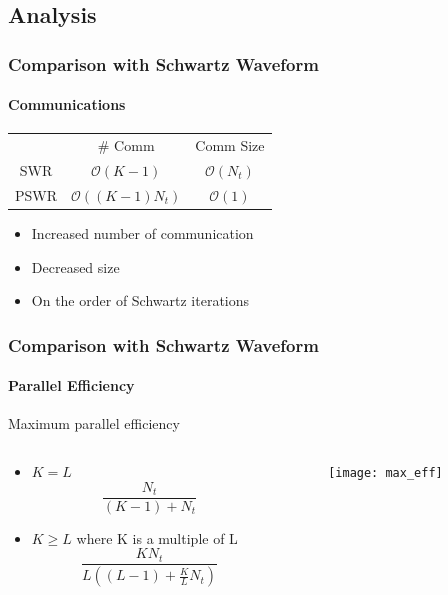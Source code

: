 \documentclass{beamer}
\begin{document}
\subsection{Analysis}

\begin{frame}
  \frametitle{Comparison with Schwartz Waveform}
  \framesubtitle{Communications}

  \begin{tabular}{c c c}
     & \# Comm & Comm Size \\
     SWR & $\mathcal{O}(K-1)$       & $\mathcal{O}(N_t)$ \\
     PSWR & $\mathcal{O}((K-1) N_t)$  & $\mathcal{O}(1)$  
  \end{tabular}

  \begin{itemize}
  \item Increased number of communication
  \item Decreased size
  \item On the order of Schwartz iterations
  \end{itemize}

\end{frame}


\begin{frame}
  \frametitle{Comparison with Schwartz Waveform}
  \framesubtitle{Parallel Efficiency}

  Maximum parallel efficiency
  \begin{columns}
    
    \begin{column}{.4\textwidth}

      \begin{itemize}
      \item $K=L$
        \[ \frac{N_t}{(K-1) + N_t} \]

      \item $K \geq L$ where K is a multiple of L
        \[ \frac{K N_t}{L\left((L-1)+\frac{K}{L} N_t\right)} \]
      \end{itemize}
    \end{column}

    \begin{column}{.8\textwidth}
      
      \begin{figure}[]
        \centering
        \texttt{[image: max\_eff]}
      \end{figure}

    \end{column}

  \end{columns}

\end{frame}
\end{document}
